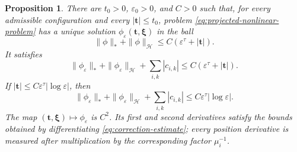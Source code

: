 \documentclass[11pt]{article}
\newtheorem{proposition}[theorem]{Proposition}
\numberwithin{equation}{section}
\begin{document}
\begin{proposition}\label{prop:nonlinear-correction}
There are $t_0>0$, $\varepsilon_0>0$, and $C>0$ such that, for every admissible configuration and every $|\boldsymbol t|\leq t_0$, problem \eqref{eq:projected-nonlinear-problem} has a unique solution
$\phi_\varepsilon(\boldsymbol t,\boldsymbol\xi)$ in the ball
\[
\|\phi\|_*+\|\phi\|_\mathcal H
\leq C(\varepsilon^\tau+|\boldsymbol t|).
\]
It satisfies
\begin{equation}\label{eq:correction-estimate}
\|\phi_\varepsilon\|_*+\|\phi_\varepsilon\|_\mathcal H
+\sum_{i,k}|c_{i,k}|
\leq C(\varepsilon^\tau+|\boldsymbol t|).
\end{equation}
If
$|\boldsymbol t|\leq C\varepsilon^\tau|\log\varepsilon|$, then
\begin{equation}\label{eq:correction-sharp}
\|\phi_\varepsilon\|_*+\|\phi_\varepsilon\|_\mathcal H
+\sum_{i,k}|c_{i,k}|
\leq C\varepsilon^\tau|\log\varepsilon|.
\end{equation}
The map $(\boldsymbol t,\boldsymbol\xi)\mapsto\phi_\varepsilon$ is $C^2$. Its first and second derivatives satisfy the bounds obtained by differentiating \eqref{eq:correction-estimate}; every position derivative is measured after multiplication by the corresponding factor $\mu_i^{-1}$.
\end{proposition}
\end{document}
